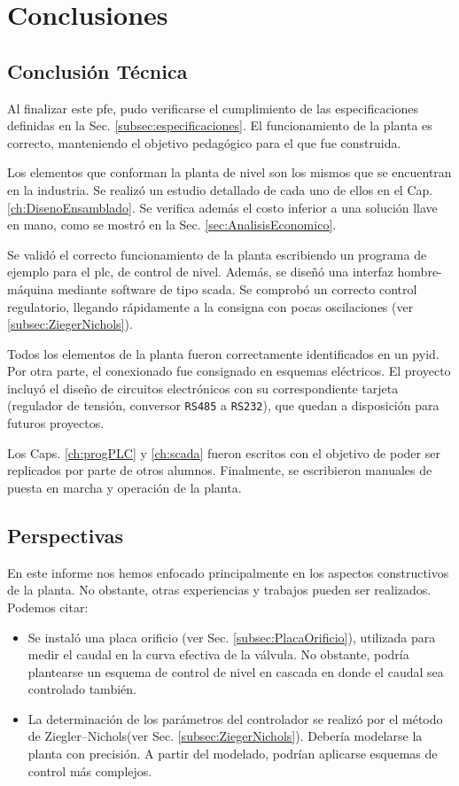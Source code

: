 \chapter{Conclusiones}
\label{ch:conclusiones}

\section{Conclusión Técnica}
\label{sec:ConclusionTecnica}

Al finalizar este \gls{pfe}, pudo verificarse el cumplimiento de las
especificaciones definidas en la Sec. \ref{subsec:especificaciones}.
El funcionamiento de la planta es correcto, manteniendo el objetivo pedagógico
para el que fue construida.

Los elementos que conforman la planta de nivel son los mismos que se
encuentran en la industria.
Se realizó un estudio detallado de cada uno de ellos en el Cap.
\ref{ch:DisenoEnsamblado}.
Se verifica además el costo inferior a una solución llave en mano, como se
mostró en la Sec. \ref{sec:AnalisisEconomico}.

Se validó el correcto funcionamiento de la planta escribiendo un programa de
ejemplo para el \gls{plc}, de control de nivel.
Además, se diseñó una interfaz hombre-máquina mediante software de tipo
\gls{scada}.
Se comprobó un correcto control regulatorio, llegando rápidamente a la consigna
con pocas oscilaciones (ver \ref{subsec:ZiegerNichols}).

Todos los elementos de la planta fueron correctamente identificados en un
\gls{pyid}.
Por otra parte, el conexionado fue consignado en esquemas eléctricos.
El proyecto incluyó el diseño de circuitos electrónicos con su correspondiente
tarjeta (regulador de tensión, conversor \verb|RS485| a \verb|RS232|), que
quedan a disposición para futuros proyectos.

Los Caps. \ref{ch:progPLC} y \ref{ch:scada} fueron escritos con el
objetivo de poder ser replicados por parte de otros alumnos.
Finalmente, se escribieron manuales de puesta en marcha y operación de la
planta.

\section{Perspectivas}
\label{sec:Perspectivas}
En este informe nos hemos enfocado principalmente en los aspectos constructivos
de la planta.
No obstante, otras experiencias y trabajos pueden ser realizados. Podemos citar:
\begin{itemize}
\item Se instaló una placa orificio (ver Sec. \ref{subsec:PlacaOrificio}), 
utilizada
para medir el caudal en la curva efectiva de la válvula.
No obstante, podría plantearse un esquema de control de nivel en cascada en
donde el caudal sea controlado también.
\item La determinación de los parámetros del controlador se realizó por 
el método de Ziegler–Nichols(ver Sec. \ref{subsec:ZiegerNichols}). Debería 
modelarse la planta con precisión. A partir del modelado, podrían aplicarse 
esquemas de control más complejos.
\end{itemize}

